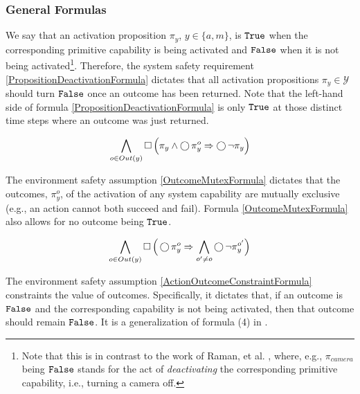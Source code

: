 \subsubsection{General Formulas}

We say that an activation proposition $\pi_y$, $y \in \{a, m\}$, is $\mathtt{True}$ when the corresponding primitive capability is being activated and $\mathtt{False}$ when it is not being activated\footnote{Note that this is in contrast to the work of Raman, et al. \cite{Vasu2013ICRA}, where, e.g., $\pi_{camera}$ being $\mathtt{False}$ stands for the act of \emph{deactivating} the corresponding primitive capability, i.e., turning a camera off.}.
Therefore, the system safety requirement \eqref{PropositionDeactivationFormula} dictates that all activation propositions $\pi_y \in \mathcal{Y}$ should turn $\mathtt{False}$ once an outcome has been returned.
Note that the left-hand side of formula \eqref{PropositionDeactivationFormula} is only $\mathtt{True}$ at those distinct time steps where an outcome was just returned.


\begin{equation}\label{PropositionDeactivationFormula}
	\bigwedge \limits_{o \in Out(y)} \operatorname{\Box} \Big( \pi_y \wedge \operatorname{\bigcirc} \pi_y^o \Rightarrow \operatorname{\bigcirc} \lnot \pi_y \Big)
\end{equation}

The environment safety assumption \eqref{OutcomeMutexFormula} dictates that the outcomes, $\pi_y^o$, of the activation of any system capability are mutually exclusive (e.g., an action cannot both succeed and fail).
Formula \eqref{OutcomeMutexFormula} also allows for no outcome being $\mathtt{True}$.

\begin{equation}\label{OutcomeMutexFormula}
	\bigwedge \limits_{o \in Out(y)} \operatorname{\Box} \Big( \operatorname{\bigcirc} \pi_y^o \Rightarrow \bigwedge \limits_{o^\prime \neq o} \operatorname{\bigcirc} \lnot \pi_y^{o^\prime} \Big)
\end{equation}

The environment safety assumption \eqref{ActionOutcomeConstraintFormula} constraints the value of outcomes.
Specifically, it dictates that, if an outcome is $\mathtt{False}$ and the corresponding capability is not being activated, then that outcome should remain $\mathtt{False}$.
It is a generalization of formula (4) in \cite{Vasu2013ICRA}.

